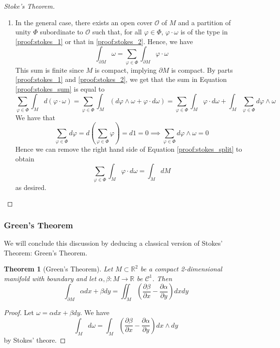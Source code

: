 \documentclass{article}
\newtheorem{theorem}{Theorem}
\newcommand{\reals}[0]{\mathbb{R}}
\newcommand{\mc}[1]{\mathcal{#1}}
\newcommand{\prt}[2]{\frac{\partial #1}{\partial #2}}
\begin{document}
\begin{proof}[Stoke's Theorem]
\begin{enumerate}
  \item In the general case, there exists an open cover \(\mc{O}\) of \(M\) and a partition of unity \(\Phi\) subordinate to \(\mc{O}\) such that, for all \(\varphi \in \Phi\), \(\varphi\cdot\omega\) is of the type in \ref{proof:stokes_1} or that in \ref{proof:stokes_2}.
  Hence, we have
  \begin{equation}
    \int_{\partial M}\omega = \sum_{\varphi \in \Phi}\int_{\partial M}\varphi \cdot \omega
    \label{proof:stokes_sum}
  \end{equation}
  This sum is finite since \(M\) is compact, implying \(\partial M\) is compact. By parts \ref{proof:stokes_1} and \ref{proof:stokes_2}, we get that the sum in Equation \ref{proof:stokes_sum} is equal to
  \begin{equation}
    \sum_{\varphi \in \Phi}\int_Md(\varphi \cdot \omega)
    = \sum_{\varphi \in \Phi}\int_M(d\varphi \wedge \omega + \varphi \cdot d\omega)
    = \sum_{\varphi \in \Phi}\int_M\varphi \cdot d\omega + \int_M \sum_{\varphi \in \Phi}d\varphi \wedge \omega
    \label{proof:stokes_split}
  \end{equation}
  We have that
  \begin{equation}
    \sum_{\varphi \in \Phi}d\varphi = d\left(\sum_{\varphi \in \Phi}\varphi\right)
    = d1 = 0 \implies \sum_{\varphi \in \Phi}d\varphi \wedge \omega = 0
  \end{equation}
  Hence we can remove the right hand side of Equation \ref{proof:stokes_split} to obtain
  \begin{equation}
    \sum_{\varphi \in \Phi}\int_M\varphi \cdot d\omega = \int_MdM
  \end{equation}
  as desired.

\end{enumerate}

\end{proof}

\subsubsection{Green's Theorem}

We will conclude this discussion by deducing a classical version of Stokes' Theorem: Green's Theorem.
\begin{theorem}[Green's Theorem]
  Let \(M \subset \reals^2\) be a compact 2-dimensional manifold with boundary and let \(\alpha, \beta : M \to \reals\) be \(\mc{C}^1\). Then
  \begin{equation}
      \int_{\partial M}\alpha dx + \beta dy = \iint_M\left(\prt{\beta}{x} - \prt{\alpha}{y}\right)dxdy
  \end{equation}
  \end{theorem}
\begin{proof}
  Let \(\omega = \alpha dx + \beta dy\). We have
  \begin{equation}
    \int_Md\omega = \int_M\left(\prt{\beta}{x} - \prt{\alpha}{y}\right)dx \wedge dy
  \end{equation}
  by Stokes' theore.
\end{proof}
\end{document}
